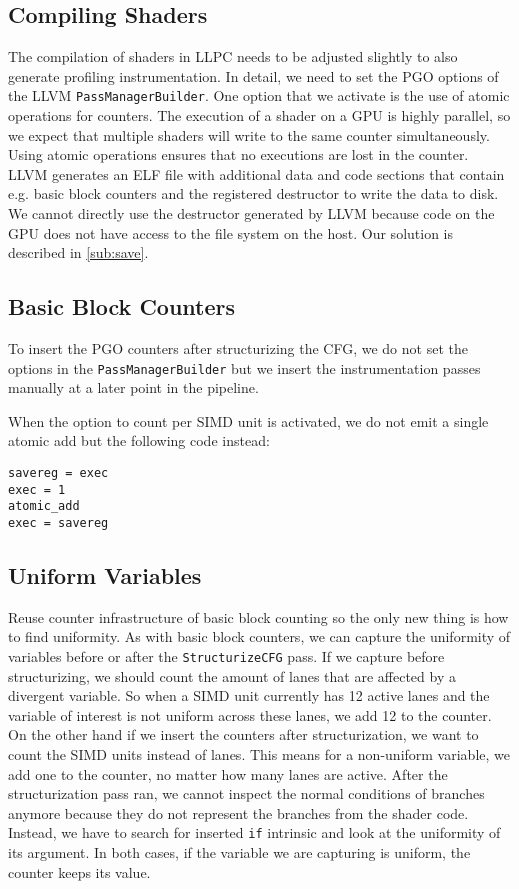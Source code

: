 \subsection{Compiling Shaders}
\label{sub:compiling}
The compilation of shaders in LLPC needs to be adjusted slightly to also generate profiling instrumentation. In detail, we need to set the PGO options of the LLVM \texttt{PassManagerBuilder}. One option that we activate is the use of atomic operations for counters. The execution of a shader on a GPU is highly parallel, so we expect that multiple shaders will write to the same counter simultaneously. Using atomic operations ensures that no executions are lost in the counter. LLVM generates an ELF file with additional data and code sections that contain e.g. basic block counters and the registered destructor to write the data to disk. We cannot directly use the destructor generated by LLVM because code on the GPU does not have access to the file system on the host. Our solution is described in \cref{sub:save}.

\subsection{Basic Block Counters}
\label{sub:bbcounters}
To insert the PGO counters after structurizing the CFG, we do not set the options in the \texttt{PassManagerBuilder} but we insert the instrumentation passes manually at a later point in the pipeline.

When the option to count per SIMD unit is activated, we do not emit a single atomic add but the following code instead:
\begin{lstlisting}[caption={Counting per SIMD unit},language={[x86masm]Assembler}]
savereg = exec
exec = 1
atomic_add
exec = savereg
\end{lstlisting}

\subsection{Uniform Variables}
\label{sub:impl_uniformity}
Reuse counter infrastructure of basic block counting so the only new thing is how to find uniformity.
As with basic block counters, we can capture the uniformity of variables before or after the \texttt{StructurizeCFG} pass. If we capture before structurizing, we should count the amount of lanes that are affected by a divergent variable.
So when a SIMD unit currently has 12 active lanes and the variable of interest is not uniform across these lanes, we add 12 to the counter.
On the other hand if we insert the counters after structurization, we want to count the SIMD units instead of lanes. This means for a non-uniform variable, we add one to the counter, no matter how many lanes are active.
After the structurization pass ran, we cannot inspect the normal conditions of branches anymore because they do not represent the branches from the shader code.
Instead, we have to search for inserted \texttt{if} intrinsic and look at the uniformity of its argument.
In both cases, if the variable we are capturing is uniform, the counter keeps its value.


